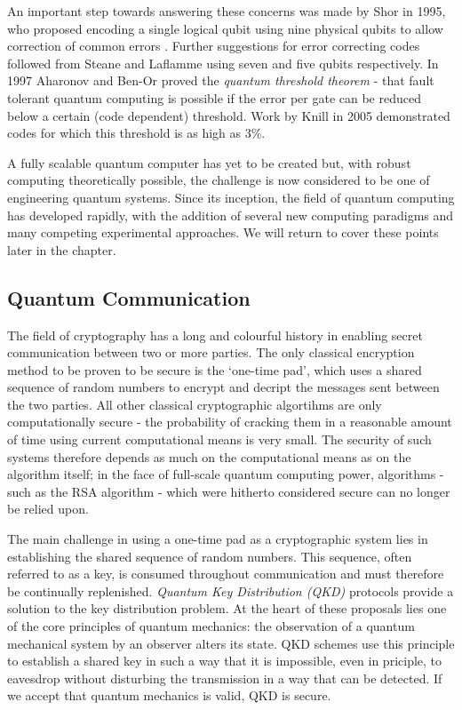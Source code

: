 An important step towards answering these concerns was made by Shor in 1995, who proposed encoding a single logical qubit using nine physical qubits to allow correction of common errors \cite{shor_codes_95}. Further suggestions for error correcting codes followed from Steane and Laflamme \cite{steane_code_96, steane_code_96_2, laflamme_5_code} using seven and five qubits respectively. In 1997 Aharonov and Ben-Or proved the \textit{quantum threshold theorem} \cite{quantum_threshold_theorem} - that fault tolerant quantum computing is possible if the error per gate can be reduced below a certain (code dependent) threshold. Work by Knill in 2005 \cite{knill_correction} demonstrated codes for which this threshold is as high as 3\%. 

A fully scalable quantum computer has yet to be created but, with robust computing theoretically possible, the challenge is now considered to be one of engineering quantum systems. Since its inception, the field of quantum computing has developed rapidly, with the addition of several new computing paradigms and many competing experimental approaches. We will return to cover these points later in the chapter.

\subsection{Quantum Communication}

The field of cryptography has a long and colourful history \cite{the_code_book} in enabling secret communication between two or more parties. The only classical encryption method to be proven to be secure is the `one-time pad', which uses a shared sequence of random numbers to encrypt and decript the messages sent between the two parties. All other classical cryptographic algortihms are only computationally secure - the probability of cracking them in a reasonable amount of time using current computational means is very small. The security of such systems therefore depends as much on the computational means as on the algorithm itself; in the face of  full-scale quantum computing power, algorithms - such as the RSA algorithm - which were hitherto considered secure can no longer be relied upon.

The main challenge in using a one-time pad as a cryptographic system lies in establishing the shared sequence of random numbers. This sequence, often referred to as a key, is consumed throughout communication and must therefore be continually replenished. \textit{Quantum Key Distribution (QKD)} protocols provide a solution to the key distribution problem. At the heart of these proposals lies one of the core principles of quantum mechanics: the observation of a quantum mechanical system by an observer alters its state. QKD schemes use this principle to establish a shared key in such a way that it is impossible, even in priciple, to eavesdrop without disturbing the transmission in a way that can be detected. If we accept that quantum mechanics is valid, QKD is secure.

